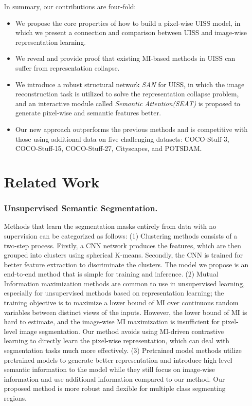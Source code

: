 \documentclass[letterpaper]{article} \usepackage{aaai23}  \usepackage{times}  \usepackage{helvet}  \usepackage{courier}  \usepackage[hyphens]{url}  \usepackage{graphicx} \urlstyle{rm} \def\UrlFont{\rm}  \usepackage{natbib}  \usepackage{caption} \frenchspacing  \setlength{\pdfpagewidth}{8.5in}  \setlength{\pdfpageheight}{11in}  \usepackage{algorithm}
\begin{document}
In summary, our contributions are four-fold:

\begin{itemize}
    \item We propose the core properties of how to build a pixel-wise UISS model, in which we present a connection and comparison between UISS and image-wise representation learning.
    
    \item We reveal and provide proof that existing MI-based methods in UISS can suffer from representation collapse.
    
    \item We introduce a robust structural network \textit{SAN} for UISS, in which the image reconstruction task is utilized to solve the representation collapse problem, and an interactive module called \textit{Semantic Attention(SEAT)} is proposed to generate pixel-wise and semantic features better.

    \item Our new approach outperforms the previous methods and is competitive with those using additional data on five challenging datasets: COCO-Stuff-3, COCO-Stuff-15, COCO-Stuff-27, Cityscapes, and POTSDAM.
\end{itemize}


\section{Related Work}

\subsubsection{Unsupervised Semantic Segmentation.}
Methods \cite{huang2022simultaneous, huang2019self} that learn the segmentation masks entirely from data with no supervision can be categorized as follows: (1) Clustering methods\cite{hwang2019segsort} consists of a two-step process. Firstly, a CNN network produces the features, which are then grouped into clusters using spherical K-means. Secondly, the CNN is trained for better feature extraction to discriminate the clusters. The model we propose is an end-to-end method that is simple for training and inference. (2)  Mutual Information maximization methods are common to use in unsupervised learning, especially for unsupervised methods based on representation learning\cite{hjelm2018learning}\cite{ji2019invariant}; the training objective is to maximize a lower bound of MI over continuous random variables between distinct views of the inputs. However, the lower bound of MI is hard to estimate, and the image-wise MI maximization is insufficient for pixel-level image segmentation. Our method avoids using MI-driven contrastive learning to directly learn the pixel-wise representation, which can deal with segmentation tasks much more effectively. (3) Pretrained model methods\cite{cho2021picie}\cite{yin2021transfgu} utilize pretrained models to generate better representation and introduce high-level semantic information to the model while they still focus on image-wise information and use additional information compared to our method.
Our proposed method is more robust and flexible for multiple class segmenting regions.
\end{document}
